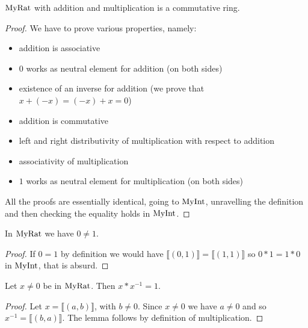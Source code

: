 \begin{proposition}
    \label{MyRat.commRing}
    \leanok
    $\mathrm{MyRat}$ with addition and multiplication is a commutative ring.
\end{proposition}
\begin{proof}
    \leanok
    We have to prove various properties, namely:
    \begin{itemize}
        \item addition is associative
        \item $0$ works as neutral element for addition (on both sides)
        \item existence of an inverse for addition (we prove that $x + (-x) = (-x) + x = 0$)
        \item addition is commutative
        \item left and right distributivity of multiplication with respect to addition
        \item associativity of multiplication
        \item $1$ works as neutral element for multiplication (on both sides)
    \end{itemize}
    All the proofs are essentially identical, going to $\mathrm{MyInt}$, unravelling the definition and then
    checking the equality holds in $\mathrm{MyInt}$.
\end{proof}

\begin{lemma}
    \label{MyRat.zero_ne_one}
    \leanok
In $\mathrm{MyRat}$ we have $0 \neq 1$.
\end{lemma}
\begin{proof}
    \leanok
    If $0 = 1$ by definition we would have $⟦ (0,1) ⟧ = ⟦ (1,1) ⟧$
    so $0*1=1*0$ in $\mathrm{MyInt}$, that is absurd.
\end{proof}

\begin{lemma}
    \label{MyRat.mul_inv_cancel}
    \leanok
Let $x \neq 0$ be in $\mathrm{MyRat}$. Then $x * x^{-1} = 1$.
\end{lemma}
\begin{proof}
    \leanok
    Let $x = ⟦ (a,b) ⟧$, with $b \neq 0$. Since $x \neq 0$ we have $a \neq 0$ and so
    $x^{-1} = ⟦ (b,a) ⟧$. The lemma follows by definition of multiplication.
\end{proof}


